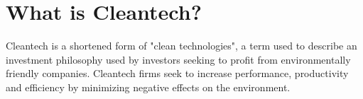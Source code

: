\section{What is Cleantech?}
Cleantech is a shortened form of "clean technologies", a term used to describe an investment philosophy used by investors seeking to profit from environmentally friendly companies. Cleantech firms seek to increase performance, productivity and efficiency by minimizing negative effects on the environment.

\clearpage
